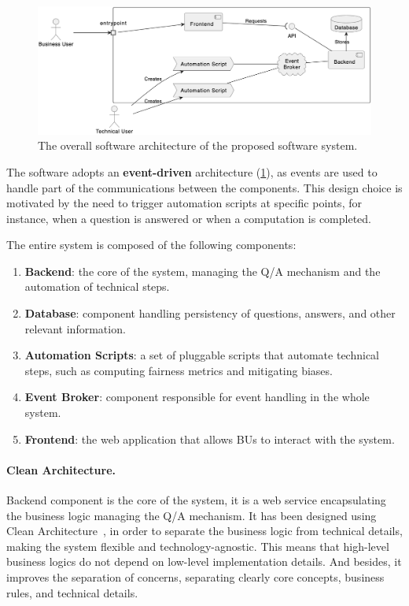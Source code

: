 \documentclass[12pt,a4paper,openright,twoside]{book}
\begin{document}
\begin{figure}
    \centering
    \includegraphics[width=\linewidth]{figures/diagrams/architecture.png}
    \caption{
        The overall software architecture of the proposed software system.
    }
    \label{fig:architecture}
\end{figure}

The software adopts an \textbf{event-driven} architecture (\cref{fig:architecture}), as events are used to handle part of the communications between the components.
%
This design choice is motivated by the need to trigger automation scripts at specific points, for instance, when a question is answered or when a computation is completed.

The entire system is composed of the following components:
\begin{enumerate}
    \item \textbf{Backend}: the core of the system, managing the \ac{Q/A} mechanism and the automation of technical steps.
    \item \textbf{Database}: component handling persistency of questions, answers, and other relevant information.
    \item \textbf{Automation Scripts}: a set of pluggable scripts that automate technical steps, such as computing fairness metrics and mitigating biases.
    \item \textbf{Event Broker}: component responsible for event handling in the whole system.
    \item \textbf{Frontend}: the web application that allows \acp{BU} to interact with the system.
\end{enumerate}

\paragraph{Clean Architecture.}

Backend component is the core of the system, it is a web service encapsulating the business logic managing the \ac{Q/A} mechanism.
%
It has been designed using Clean Architecture~\cite{martin2017clean}, in order to separate the business logic from technical details, making the system flexible and technology-agnostic.
%
This means that high-level business logics do not depend on low-level implementation details.
%
And besides, it improves the separation of concerns, separating clearly core concepts, business rules, and technical details.
\end{document}
